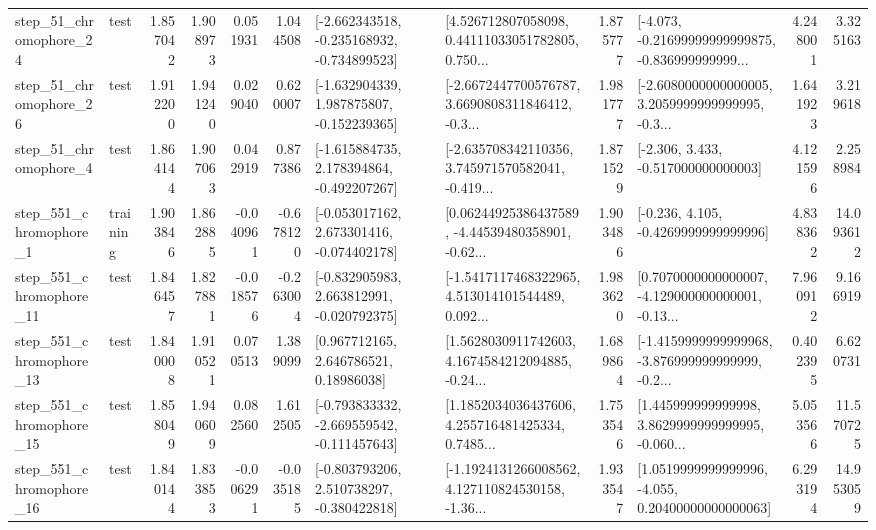 \begin{tabular}{llrrrrllrlrr}
   step\_51\_chromophore\_24 &      test &      1.857042 &    1.908973 &      0.051931 &  1.044508 &  [-2.662343518, -0.235168932, -0.734899523] &  [4.526712807058098, 0.44111033051782805, 0.750... &       1.875777 &  [-4.073, -0.21699999999999875, -0.836999999999... &            4.248001 &          3.325163 \\
   step\_51\_chromophore\_26 &      test &      1.912200 &    1.941240 &      0.029040 &  0.620007 &   [-1.632904339, 1.987875807, -0.152239365] &  [-2.6672447700576787, 3.6690808311846412, -0.3... &       1.981777 &  [-2.6080000000000005, 3.2059999999999995, -0.3... &            1.641923 &          3.219618 \\
    step\_51\_chromophore\_4 &      test &      1.864144 &    1.907063 &      0.042919 &  0.877386 &   [-1.615884735, 2.178394864, -0.492207267] &  [-2.635708342110356, 3.745971570582041, -0.419... &       1.871529 &                [-2.306, 3.433, -0.517000000000003] &            4.121596 &          2.258984 \\
   step\_551\_chromophore\_1 &  training &      1.903846 &    1.862885 &     -0.040961 & -0.678120 &   [-0.053017162, 2.673301416, -0.074402178] &  [0.06244925386437589, -4.44539480358901, -0.62... &       1.903486 &               [-0.236, 4.105, -0.4269999999999996] &            4.838362 &         14.093612 \\
  step\_551\_chromophore\_11 &      test &      1.846457 &    1.827881 &     -0.018576 & -0.263004 &   [-0.832905983, 2.663812991, -0.020792375] &  [-1.5417117468322965, 4.513014101544489, 0.092... &       1.983620 &  [0.7070000000000007, -4.129000000000001, -0.13... &            7.960912 &          9.166919 \\
  step\_551\_chromophore\_13 &      test &      1.840008 &    1.910521 &      0.070513 &  1.389099 &      [0.967712165, 2.646786521, 0.18986038] &  [1.5628030911742603, 4.1674584212094885, -0.24... &       1.689864 &  [-1.4159999999999968, -3.876999999999999, -0.2... &            0.402395 &          6.620731 \\
  step\_551\_chromophore\_15 &      test &      1.858049 &    1.940609 &      0.082560 &  1.612505 &  [-0.793833332, -2.669559542, -0.111457643] &  [1.1852034036437606, 4.255716481425334, 0.7485... &       1.753546 &  [1.445999999999998, 3.8629999999999995, -0.060... &            5.053566 &         11.570725 \\
  step\_551\_chromophore\_16 &      test &      1.840144 &    1.833853 &     -0.006291 & -0.035185 &   [-0.803793206, 2.510738297, -0.380422818] &  [-1.1924131266008562, 4.127110824530158, -1.36... &       1.933547 &  [1.0519999999999996, -4.055, 0.20400000000000063] &            6.293194 &         14.953059 \\

\end{tabular}
